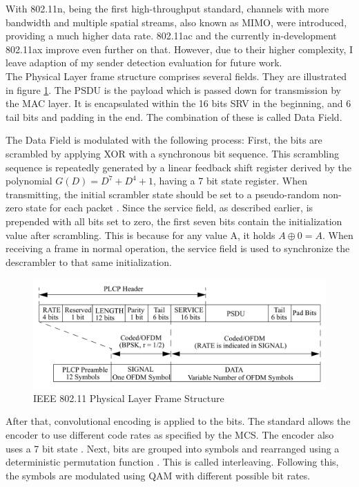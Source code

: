 With 802.11n, being the first high-throughput standard, channels with more bandwidth and multiple spatial streams, also known as \gls{MIMO}, were introduced, providing a much higher data rate. 802.11ac and the currently in-development 802.11ax improve even further on that. However, due to their higher complexity, I leave adaption of my sender detection evaluation for future work.\\

The Physical Layer frame structure comprises several fields. They are illustrated in figure \ref{fig:phy-format}. The \gls{PSDU} is the payload which is passed down for transmission by the \gls{MAC} layer. It is encapsulated within the 16 bits \gls{SRV} in the beginning, and 6 tail bits and padding in the end. The combination of these is called Data Field.

The Data Field is modulated with the following process: First, the bits are scrambled by applying XOR with a synchronous bit sequence. This scrambling sequence is repeatedly generated by a linear feedback shift register derived by the polynomial $G(D)=D^7+D^4+1$, having a 7 bit state register. When transmitting, the initial scrambler state should be set to a pseudo-random non-zero state for each packet \cite{ieee2012}. Since the service field, as described earlier, is prepended with all bits set to zero, the first seven bits contain the initialization value after scrambling. This is because for any value A, it holds $A \oplus 0 = A$. When receiving a frame in normal operation, the service field is used to synchronize the descrambler to that same initialization.

\begin{figure}[H]
	\centering
	\includegraphics[width=\textwidth]{gfx/images/phy-format}
	\caption[\gls{IEEE} 802.11 Physical Layer Frame Structure]{\gls{IEEE} 802.11 Physical Layer Frame Structure \cite{ieee2012}}
	\label{fig:phy-format}
\end{figure}

After that, convolutional encoding is applied to the bits. The standard allows the encoder to use different code rates as specified by the \gls{MCS}. The encoder also uses a 7 bit state \cite{park2009}. Next, bits are grouped into symbols and rearranged using a deterministic permutation function \cite{perahia2013}. This is called interleaving. Following this, the symbols are modulated using \gls{QAM}	with different possible bit rates.\\

